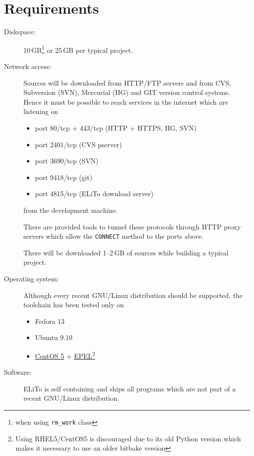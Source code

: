 \chapter{Requirements}
\label{chap:reqs}

\begin{description}
\item[Diskspace:] 10\,GB\footnote{when using \texttt{rm\_work} class}
  or 25\,GB per typical project.
\item[Network access:] Sources will be downloaded from HTTP/FTP
  servers and from CVS, Subversion (SVN), Mercurial (HG) and GIT
  version control systems. Hence it must be possible to reach services
  in the internet which are listening on
  \begin{itemize}
  \item port 80/tcp + 443/tcp  (HTTP + HTTPS, HG, SVN)
  \item port 2401/tcp (CVS pserver)
  \item port 3690/tcp (SVN)
  \item port 9418/tcp (git)
  \item port 4815/tcp (ELiTo download server)
  \end{itemize}
  from the development machine.

  There are provided tools to tunnel these protocols through HTTP
  proxy servers which allow the \texttt{CONNECT} method to the ports
  above.

  There will be downloaded 1--2\,GB of sources while building a
  typical project.
\item[Operating system:] Although every recent GNU/Linux distribution
  should be supported, the toolchain has been tested only on
  \begin{itemize}
  \item Fedora 13
  \item Ubuntu 9.10
  \item \href{http://centos.org}{CentOS 5} +
    \href{https://fedoraproject.org/wiki/EPEL}{EPEL}\footnote{Using
      RHEL5/CentOS5 is discouraged due to its old Python version which
      makes it necessary to use an older bitbake version}
  \end{itemize}
\item[Software:] ELiTo is self containing and ships all programs which
  are not part of a recent GNU/Linux distribution.
\end{description}
